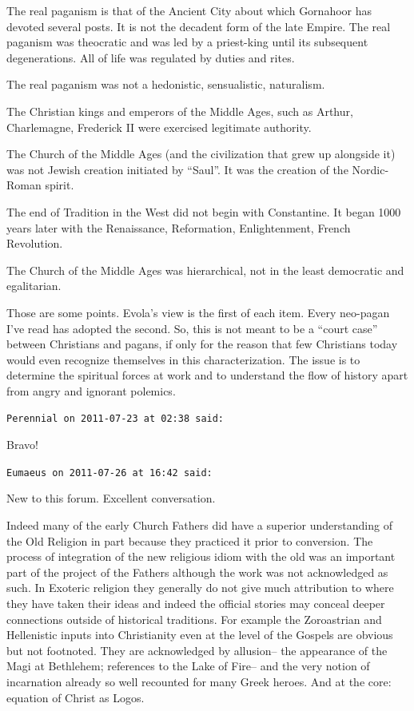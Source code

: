 \begin{footnotesize}
\begin{sffamily}
The real paganism is that of the Ancient City about which Gornahoor has devoted several posts. It is not the decadent form of the late Empire. The real paganism was theocratic and was led by a priest-king until its subsequent degenerations. All of life was regulated by duties and rites.

The real paganism was not a hedonistic, sensualistic, naturalism.

The Christian kings and emperors of the Middle Ages, such as Arthur, Charlemagne, Frederick II were exercised legitimate authority.

The Church of the Middle Ages (and the civilization that grew up alongside it) was not Jewish creation initiated by ``Saul''. It was the creation of the Nordic-Roman spirit.

The end of Tradition in the West did not begin with Constantine. It began 1000 years later with the Renaissance, Reformation, Enlightenment, French Revolution.

The Church of the Middle Ages was hierarchical, not in the least democratic and egalitarian.

Those are some points. Evola's view is the first of each item. Every neo-pagan I've read has adopted the second. So, this is not meant to be a ``court case'' between Christians and pagans, if only for the reason that few Christians today would even recognize themselves in this characterization. The issue is to determine the spiritual forces at work and to understand the flow of history apart from angry and ignorant polemics.

\hfill

\texttt{Perennial on 2011-07-23 at 02:38 said:}

Bravo!

\hfill

\texttt{Eumaeus on 2011-07-26 at 16:42 said:}

New to this forum. Excellent conversation.

Indeed many of the early Church Fathers did have a superior understanding of the Old Religion in part because they practiced it prior to conversion. The process of integration of the new religious idiom with the old was an important part of the project of the Fathers although the work was not acknowledged as such. In Exoteric religion they generally do not give much attribution to where they have taken their ideas and indeed the official stories may conceal deeper connections outside of historical traditions. For example the Zoroastrian and Hellenistic inputs into Christianity even at the level of the Gospels are obvious but not footnoted. They are acknowledged by allusion-- the appearance of the Magi at Bethlehem; references to the Lake of Fire-- and the very notion of incarnation already so well recounted for many Greek heroes. And at the core: equation of Christ as Logos.


\end{sffamily}
\end{footnotesize}
